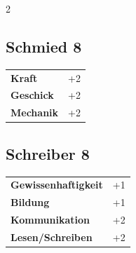 \begin{multicols}{2}
\begin{tcolorbox}

\end{tcolorbox}

\begin{tcolorbox}
    \subsection*{Schmied \hfill \small{8 }}
    \tcblower




\begin{tabular}{@{}ll@{}}
    \textbf{Kraft} & +2\\
    \textbf{Geschick} & +2\\
    \textbf{Mechanik} & +2\\
\end{tabular}


\end{tcolorbox}

\begin{tcolorbox}
    \subsection*{Schreiber \hfill \small{8 }}
    \tcblower




\begin{tabular}{@{}ll@{}}
    \textbf{Gewissenhaftigkeit} & +1\\
    \textbf{Bildung} & +1\\
    \textbf{Kommunikation} & +2\\
    \textbf{Lesen/Schreiben} & +2\\
\end{tabular}


\end{tcolorbox}


\end{multicols}
